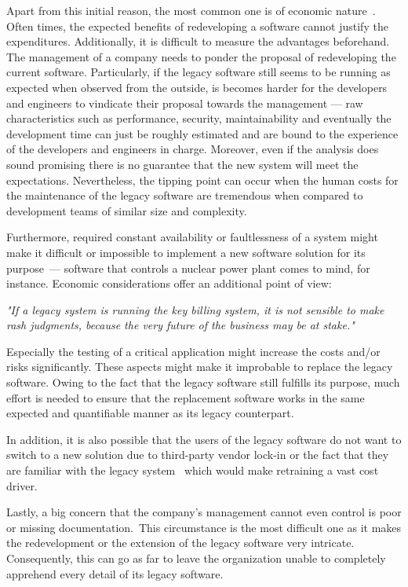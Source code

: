 \documentclass[12pt,a4paper,twoside]{report}
\begin{document}
Apart from this initial reason, the most common one is of economic nature~\cite{schneidewind-preserve-or-redesign}.
Often times, the expected benefits of redeveloping a software cannot justify the expenditures.
Additionally, it is difficult to measure the advantages beforehand. The management
of a company needs to ponder the proposal of redeveloping the current software.
Particularly, if the legacy software still seems to be running as expected when observed
from the outside, is becomes harder for the developers and engineers to vindicate
their proposal towards the management --- raw characteristics such as performance,
security, maintainability and eventually the development time can just be roughly estimated and
are bound to the experience of the developers and engineers in charge.
Moreover, even if the analysis does sound promising there is no guarantee that the new system
will meet the expectations. Nevertheless, the tipping point can occur when the human costs for the maintenance
of the legacy software are tremendous when compared to development teams of similar size and complexity.

Furthermore, required constant availability or faultlessness of a system might make it
difficult or impossible to implement a new software solution for its purpose~\cn ---
software that controls a nuclear power plant comes to mind, for instance.
Economic considerations offer an additional point of view:
\begin{displayquote}
\emph{"If a legacy system is running the key billing system, it is not sensible
to make rash judgments, because the very future of the business may be at stake."}~\cite{bennett-coping-legacy}
\end{displayquote}
Especially the testing of a critical application might increase the costs
and/or risks significantly. These aspects might make it improbable to replace
the legacy software. Owing to the fact that the legacy software still fulfills
its purpose, much effort is needed to ensure that the replacement software works
in the same expected and quantifiable manner as its legacy counterpart.

In addition, it is also possible that the users of the legacy software do not want
to switch to a new solution due to third-party vendor lock-in or the fact that
they are familiar with the legacy system~\cite{bennett-coping-legacy} which would make
retraining a vast cost driver.

Lastly, a big concern that the company's management cannot even control is
poor or missing documentation.~\cn This circumstance is the most difficult one
as it makes the redevelopment or the extension of the legacy software very intricate.
Consequently, this can go as far to leave the organization unable to completely apprehend
every detail of its legacy software.
\end{document}

